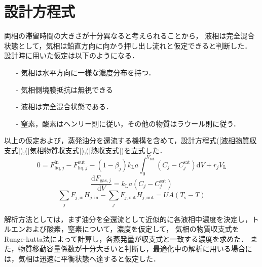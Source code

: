 \documentclass[a4j]{jsreport}
\newcommand{\diff}{\mathrm{d}}
\begin{document}
\section{設計方程式}
両相の滞留時間の大きさが十分異なると考えられることから，
液相は完全混合状態として，気相は鉛直方向に向かう押し出し流れと仮定できると判断した．
設計時に用いた仮定は以下のようになる．
\begin{itemize}
    \item[-] 気相は水平方向に一様な濃度分布を持つ．
    \item[-] 気相側境膜抵抗は無視できる
    \item[-] 液相は完全混合状態である．
    \item[-] 窒素，酸素はヘンリー則に従い，その他の物質はラウール則に従う．
\end{itemize}
以上の仮定および，蒸発油分を還流する機構を含めて，設計方程式(\ref{液相物質収支式}),(\ref{気相物質収支式}),(\ref{熱収支式})を立式した．
\begin{equation}
    \label{液相物質収支式}
    0 = F^\text{in}_{\text{liq},j} - F^\text{out}_{\text{liq},j} - (1-\beta_j) k_\mathrm{L}a
    \int^{V_\text{tot}}_0(C_j - C^\text{sat}_j) \diff V + r_j V_\mathrm{L}
\end{equation}
\begin{equation}
    \label{気相物質収支式}
    \frac{ \diff F_{\text{gas},j}}{\diff V} = k_\mathrm{L}a (C_j - C^\text{sat}_j)
\end{equation}
\begin{equation}
    \label{熱収支式}
    \sum_jF_{j,\mathrm{in}}H_{j,\mathrm{in}}-\sum_jF_{j,\text{out}}H_{j,\text{out}} = UA(T_\mathrm{s}-T)
\end{equation}

解析方法としては，まず油分を全還流として近似的に各液相中濃度を決定し，トルエンおよび酸素，窒素について，濃度を仮定して，
気相の物質収支式をRunge-kutta法によって計算し，各蒸発量が収支式と一致する濃度を求めた．
また，物質移動容量係数が十分大きいと判断し，最適化中の解析に用いる場合には，気相は迅速に平衡状態へ達すると仮定した．
\end{document}
